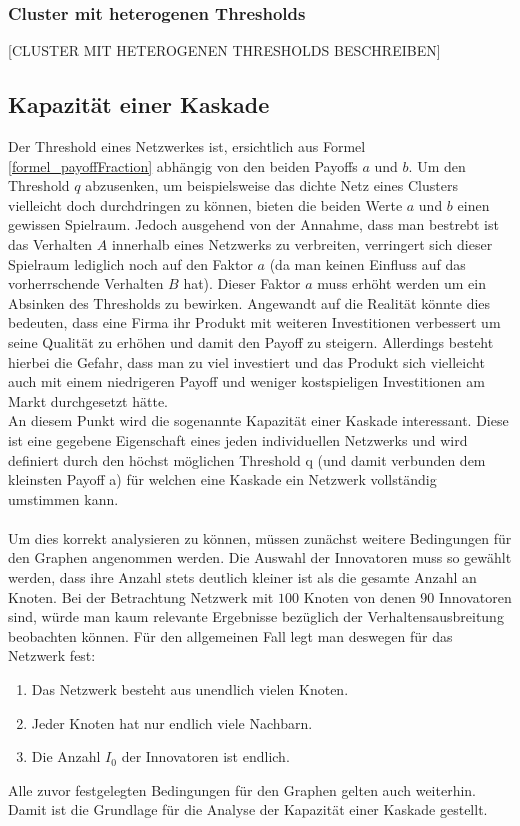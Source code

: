 \documentclass[12pt]{article}
\begin{document}
\subsubsection{Cluster mit heterogenen Thresholds}
[CLUSTER MIT HETEROGENEN THRESHOLDS BESCHREIBEN]
 
\subsection{Kapazität einer Kaskade}
Der Threshold eines Netzwerkes ist, ersichtlich aus Formel \ref{formel_payoffFraction} abhängig von den beiden Payoffs $a$ und $b$. Um den Threshold $q$ abzusenken, um beispielsweise das dichte Netz eines Clusters vielleicht doch durchdringen zu können, bieten die beiden Werte $a$ und $b$ einen gewissen Spielraum. Jedoch ausgehend von der Annahme, dass man bestrebt ist das Verhalten $A$ innerhalb eines Netzwerks zu verbreiten, verringert sich dieser Spielraum lediglich noch auf den Faktor $a$ (da man keinen Einfluss auf das vorherrschende Verhalten $B$ hat). Dieser Faktor $a$ muss erhöht werden um ein Absinken des Thresholds zu bewirken. Angewandt auf die Realität könnte dies bedeuten, dass eine Firma ihr Produkt mit weiteren Investitionen verbessert um seine Qualität zu erhöhen und damit den Payoff zu steigern. Allerdings besteht hierbei die Gefahr, dass man zu viel investiert und das Produkt sich vielleicht auch mit einem niedrigeren Payoff und weniger kostspieligen Investitionen am Markt durchgesetzt hätte.\\
An diesem Punkt wird die sogenannte Kapazität einer Kaskade interessant. Diese ist eine gegebene Eigenschaft eines jeden individuellen Netzwerks und wird definiert durch den höchst möglichen Threshold q (und damit verbunden dem kleinsten Payoff a) für welchen eine Kaskade ein Netzwerk vollständig umstimmen kann.\\\\
Um dies korrekt analysieren zu können, müssen zunächst weitere Bedingungen für den Graphen angenommen werden. Die Auswahl der Innovatoren muss so gewählt werden, dass ihre Anzahl stets deutlich kleiner ist als die gesamte Anzahl an Knoten. Bei der Betrachtung Netzwerk mit $100$ Knoten von denen $90$ Innovatoren sind, würde man kaum relevante Ergebnisse bezüglich der Verhaltensausbreitung beobachten können. Für den allgemeinen Fall legt man deswegen für das Netzwerk fest:
\begin{enumerate}
\item Das Netzwerk besteht aus unendlich vielen Knoten.
\item Jeder Knoten hat nur endlich viele Nachbarn.
\item Die Anzahl $I_0$ der Innovatoren ist endlich.
\end{enumerate}
Alle zuvor festgelegten Bedingungen für den Graphen gelten auch weiterhin. Damit ist die Grundlage für die Analyse der Kapazität einer Kaskade gestellt.
\end{document}
